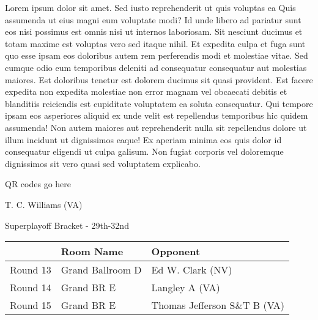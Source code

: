 \documentclass{article}%
\begin{document}
\vspace*{8pt}%
\linebreak%
\newline%
\newline%
Lorem ipsum dolor sit amet. Sed iusto reprehenderit ut quis voluptas ea Quis assumenda ut eius magni eum voluptate modi? Id unde libero ad pariatur sunt eos nisi possimus est omnis nisi ut internos laboriosam. Sit nesciunt ducimus et totam maxime est voluptas vero sed itaque nihil. Et expedita culpa et fuga sunt quo esse ipsam eos doloribus autem rem perferendis modi et molestiae vitae.\newline%
\newline%
Sed cumque odio eum temporibus deleniti ad consequatur consequatur aut molestias maiores. Est doloribus tenetur est dolorem ducimus sit quasi provident. Est facere expedita non expedita molestiae non error magnam vel obcaecati debitis et blanditiis reiciendis est cupiditate voluptatem ea soluta consequatur. Qui tempore ipsam eos asperiores aliquid ex unde velit est repellendus temporibus hic quidem assumenda!\newline%
\newline%
Non autem maiores aut reprehenderit nulla sit repellendus dolore ut illum incidunt ut dignissimos eaque! Ex aperiam minima eos quis dolor id consequatur eligendi ut culpa galisum. Non fugiat corporis vel doloremque dignissimos sit vero quasi sed voluptatem explicabo.\newline%
\newline%
%
\vspace*{30pt}%
\begin{center}%
\begin{Huge}%
QR codes go here%
\end{Huge}%
\end{center}%
\newpage%
\begin{center}%
\begin{Huge}%
T. C. Williams (VA)%
\end{Huge}%
\vspace*{8pt}%
\linebreak%
\begin{Large}%
Superplayoff Bracket {-} 29th{-}32nd%
\end{Large}%
\end{center}%
%
\begin{tabularx}{\textwidth}{|c|Y|Y|}%
\hline%
&Room Name&Opponent\\%
\hline%
Round 13&Grand Ballroom D&Ed W. Clark (NV)\\%
Round 14&Grand BR E&Langley A (VA)\\%
Round 15&Grand BR E&Thomas Jefferson S\&T B (VA)\\%
\hline%
\end{tabularx}%
\end{document}
